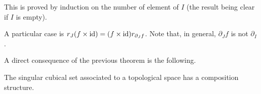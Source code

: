 This is proved  by induction on the number of element of $I$ (the
  result being clear if $I$ is empty).

A particular case is $r_J(f\times\mathrm{id}) = (f\times\mathrm{id})r_{\partial_J
  f}$. Note that, in general, $\partial_Jf$ is not $\partial_I$.

\medskip

A direct consequence of the previous theorem is the following.

\begin{corollary} The singular cubical set associated to a topological space
has a composition structure.
\end{corollary}



